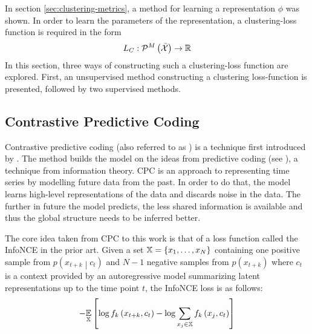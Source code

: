 In section \ref{sec:clustering-metrics}, a method for learning a representation \( \phi \) was shown. In order to learn the parameters of the representation, a clustering-loss function is required in the form
\[ L_C : \mathcal{P}^M \left( \bar{\mathcal{X}} \right) \to \mathbb{R} \]
In this section, three ways of constructing such a clustering-loss function are explored. First, an unsupervised method constructing a clustering loss-function is presented, followed by two supervised methods.

\subsection{Contrastive Predictive Coding}
Contrastive predictive coding (also referred to as ) is a technique first introduced by \cite{oord_representation_2019}. The method builds the model on the ideas from predictive coding (see \cite{elias_predictive_1955}), a technique from information theory. CPC is an approach to representing time series by modelling future data from the past. In order to do that, the model learns high-level representations of the data and discards noise in the data. The further in future the model predicts, the less shared information is available and thus the global structure needs to be inferred better.

The core idea taken from CPC to this work is that of a loss function called the InfoNCE in the prior art. Given a set \( \mathbb{X} = \left\{ x_1, \dots, x_N \right\} \) containing one positive sample from \( p \left( x_{t + k} \middle| c_t \right) \) and \( N - 1 \) negative samples from \( p \left( x_{t + k} \right) \) where \( c_t \) is a context provided by an autoregressive model summarizing latent representations up to the time point \( t \), the InfoNCE loss is as follows:
\[ - \underset{\mathbb{X}}{\mathbb{E}} \left[ \log f_k \left( x_{t + k}, c_t \right) - \log \sum_{x_j \in \mathbb{X}} f_k \left( x_j, c_t \right) \right] \]

